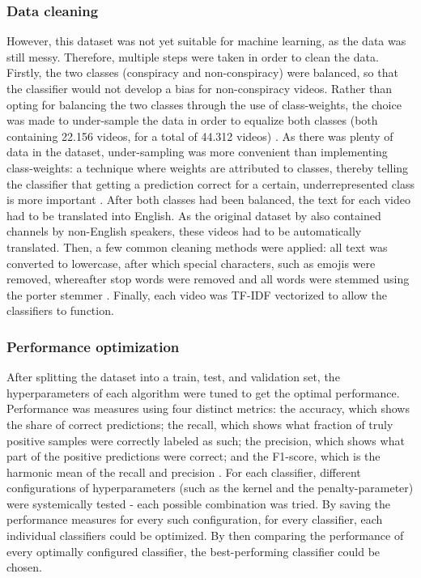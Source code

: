 \documentclass[../main.tex]{subfiles}
\begin{document}
\subsubsection{Data cleaning}
However, this dataset was not yet suitable for machine learning, as the data was still messy. Therefore,
multiple steps were taken in order to clean the data. Firstly, the two classes (conspiracy and
non-conspiracy) were balanced, so that the classifier would not develop a bias for non-conspiracy
videos. Rather than opting for balancing the two classes through the use of class-weights, the choice
was made to under-sample the data in order to equalize both classes (both containing 22.156 videos, for
a total of 44.312 videos) \citep{lemaitre2017imbalanced}. As there was plenty of data in the dataset,
under-sampling was more convenient than implementing class-weights: a technique where weights are
attributed to classes, thereby telling the classifier that getting a prediction correct for a certain,
underrepresented class is more important \citep{sun2006boosting}. After both classes had been balanced,
the text for each video had to be translated into English. As the original dataset by
\citet{ledwich2019algorithmic} also contained channels by non-English speakers, these videos had to be
automatically translated. Then, a few common cleaning methods were applied: all text was converted to
lowercase, after which special characters, such as emojis were removed, whereafter stop words were
removed and all words were stemmed using the porter stemmer \citep{karaa2013new}. Finally, each video
was TF-IDF vectorized to allow the classifiers to function.

\subsubsection{Performance optimization}
After splitting the dataset into a train, test, and validation set, the hyperparameters of each
algorithm were tuned to get the optimal performance. Performance was measures using four distinct
metrics: the accuracy, which shows the share of correct predictions; the recall, which shows what
fraction of truly positive samples were correctly labeled as such; the precision, which shows what part
of the positive predictions were correct; and the F1-score, which is the harmonic mean of the recall and
precision \citep{sokolova2009systematic}. For each classifier, different configurations of
hyperparameters (such as the kernel and the penalty-parameter) were systemically tested - each possible
combination was tried. By saving the performance measures for every such configuration, for every
classifier, each individual classifiers could be optimized. By then comparing the performance of every
optimally configured classifier, the best-performing classifier could be chosen. 
\end{document}
